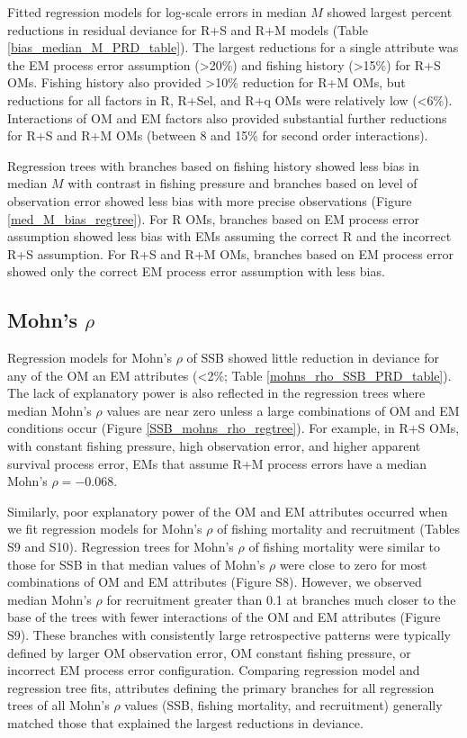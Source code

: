 \documentclass[
  12pt,
]{article}
\begin{document}
Fitted regression models for log-scale errors in median \(M\) showed
largest percent reductions in residual deviance for R+S and R+M models
(Table \ref{bias_median_M_PRD_table}). The largest reductions for a
single attribute was the EM process error assumption (\textgreater20\%)
and fishing history (\textgreater15\%) for R+S OMs. Fishing history also
provided \textgreater10\% reduction for R+M OMs, but reductions for all
factors in R, R+Sel, and R+q OMs were relatively low (\textless6\%).
Interactions of OM and EM factors also provided substantial further
reductions for R+S and R+M OMs (between 8 and 15\% for second order
interactions).

Regression trees with branches based on fishing history showed less bias
in median \(M\) with contrast in fishing pressure and branches based on
level of observation error showed less bias with more precise
observations (Figure \ref{med_M_bias_regtree}). For R OMs, branches
based on EM process error assumption showed less bias with EMs assuming
the correct R and the incorrect R+S assumption. For R+S and R+M OMs,
branches based on EM process error showed only the correct EM process
error assumption with less bias.

\subsection*{\texorpdfstring{Mohn's
\(\rho\)}{Mohn's \textbackslash rho}}\label{mohns-rho-1}

Regression models for Mohn's \(\rho\) of SSB showed little reduction in
deviance for any of the OM an EM attributes (\textless2\%; Table
\ref{mohns_rho_SSB_PRD_table}). The lack of explanatory power is also
reflected in the regression trees where median Mohn's \(\rho\) values
are near zero unless a large combinations of OM and EM conditions occur
(Figure \ref{SSB_mohns_rho_regtree}). For example, in R+S OMs, with
constant fishing pressure, high observation error, and higher apparent
survival process error, EMs that assume R+M process errors have a median
Mohn's \(\rho = -0.068\).

Similarly, poor explanatory power of the OM and EM attributes occurred
when we fit regression models for Mohn's \(\rho\) of fishing mortality
and recruitment (Tables S9 and S10). Regression trees for Mohn's
\(\rho\) of fishing mortality were similar to those for SSB in that
median values of Mohn's \(\rho\) were close to zero for most
combinations of OM and EM attributes (Figure S8). However, we observed
median Mohn's \(\rho\) for recruitment greater than 0.1 at branches much
closer to the base of the trees with fewer interactions of the OM and EM
attributes (Figure S9). These branches with consistently large
retrospective patterns were typically defined by larger OM observation
error, OM constant fishing pressure, or incorrect EM process error
configuration. Comparing regression model and regression tree fits,
attributes defining the primary branches for all regression trees of all
Mohn's \(\rho\) values (SSB, fishing mortality, and recruitment)
generally matched those that explained the largest reductions in
deviance.
\end{document}
